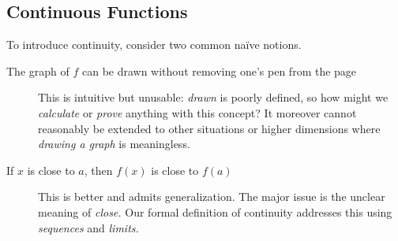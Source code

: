 \goodbreak


\setcounter{subsection}{16}
\subsection{Continuous Functions}\label{sec:cont}

To introduce continuity, consider two common naïve notions.
\begin{description}
  \item[The graph of $f$ can be drawn without removing one's pen from the page] This is intuitive but unusable: \emph{drawn} is poorly defined, so how might we \emph{calculate} or \emph{prove} anything with this concept? It moreover cannot reasonably be extended to other situations or higher dimensions where \emph{drawing a graph} is meaningless.
  \item[If $x$ is close to $a$, then $f(x)$ is close to $f(a)$] This is better and admits  generalization. The major issue is the unclear meaning of \emph{close.} Our formal definition of continuity addresses this using \emph{sequences} and \emph{limits.}
\end{description}


